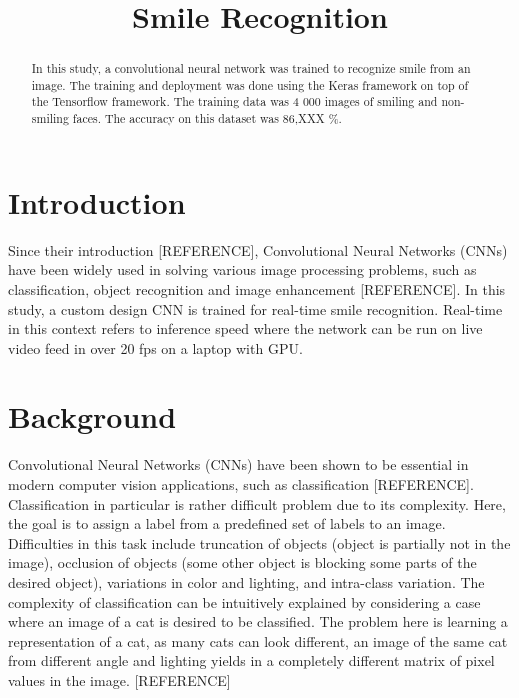 \documentclass{article}
\title{Smile Recognition}
\begin{document}
\maketitle
\sloppy

\begin{abstract}
In this study, a convolutional neural network was trained to recognize
smile from an image. The training and deployment was done using the
Keras framework on top of the Tensorflow framework. The training data
was 4 000 images of smiling and non-smiling faces. The accuracy on
this dataset was 86,XXX \%.
\end{abstract}

\section{Introduction}\label{sec:intro}
Since their introduction [REFERENCE], Convolutional Neural Networks
(CNNs) have been widely used in solving various image processing
problems, such as classification, object recognition and image
enhancement [REFERENCE]. In this study, a custom design CNN is trained
for real-time smile recognition. Real-time in this context refers to
inference speed where the network can be run on live video feed in
over 20 fps on a laptop with GPU\@.

\section{Background}\label{sec:background}
Convolutional Neural Networks (CNNs) have been shown to be essential in
modern computer vision applications, such as classification
[REFERENCE]. Classification in particular is rather difficult problem
due to its complexity. Here, the goal is to assign a label from a
predefined set of labels to an image. Difficulties in this task
include truncation of objects (object is partially not in the image),
occlusion of objects (some other object is blocking some parts of
the desired object), variations in color and lighting, and intra-class
variation. The complexity of classification can be intuitively
explained by considering a case where an image of a cat is desired to
be classified. The problem here is learning a representation of a cat,
as many cats can look different, an image of the same cat from
different angle and lighting yields in a completely different matrix
of pixel values in the image. [REFERENCE]
\end{document}
